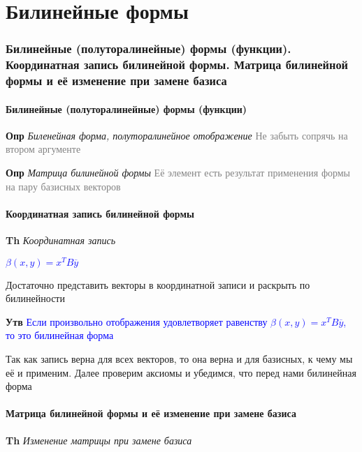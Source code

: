 \documentclass[a4paper, 14pt]{article}
\begin{document}
    

     \part*{Билинейные формы}

    \section{Билинейные (полуторалинейные) формы (функции).
    Координатная запись билинейной формы.
    Матрица билинейной формы и её изменение при замене базиса}

    \subsection{Билинейные (полуторалинейные) формы (функции)}

    \textbf{Опр} \textit{Биленейная форма, полуторалинейное отображение} \textcolor{gray}{Не забыть сопрячь на втором
    аргументе}

    \textbf{Опр} \textit{Матрица билинейной формы} \textcolor{gray}{Её элемент есть результат применения формы на
    пару базисных векторов}

    \subsection{Координатная запись билинейной формы}

    \textbf{Th} \textit{Координатная запись}

    \textcolor{blue}{$\beta (x, y) = x^T B \overline{y}$}

    Достаточно представить векторы в координатной записи и раскрыть по билинейности

    \textbf{Утв} \textcolor{blue}{Если произвольно отображения удовлетворяет
    равенству $\beta (x, y) = x^T B \overline{y}$, то это билинейная форма}

    Так как запись верна для всех векторов, то она верна и для базисных, к чему мы её и применим.
    Далее проверим аксиомы и убедимся, что перед нами билинейная форма

    \subsection{Матрица билинейной формы и её изменение при замене базиса}

    \textbf{Th} \textit{Изменение матрицы при замене базиса}
\end{document}
